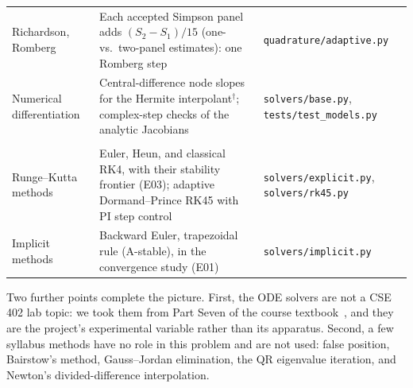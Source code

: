 \begin{table}[tp]
\begin{tabularx}{\textwidth}{@{}>{\raggedright\arraybackslash}p{2.7cm}
      >{\raggedright\arraybackslash}X >{\raggedright\arraybackslash}p{3.5cm}@{}}
    Richardson, Romberg & Each accepted Simpson panel adds $(S_2 - S_1)/15$ (one- vs.\ two-panel
      estimates): one Romberg step & \texttt{quadrature/adaptive.py} \\
    Numerical differentiation & Central-difference node slopes for the Hermite
      interpolant$^\dagger$; complex-step checks of the analytic Jacobians
      & \texttt{solvers/base.py}, \texttt{tests/test\_models.py} \\
    \midrule
    \multicolumn{3}{@{}l}{\textbf{Beyond the lab outline: ODE solvers (course textbook~\cite{chapra2015}, Part Seven)}} \\
    Runge--Kutta methods & Euler, Heun, and classical RK4, with their stability frontier (E03);
      adaptive Dormand--Prince RK45 with PI step control
      & \texttt{solvers/explicit.py}, \texttt{solvers/rk45.py} \\
    Implicit methods & Backward Euler, trapezoidal rule (A-stable), in the convergence study (E01)
      & \texttt{solvers/implicit.py} \\
    \bottomrule
  \end{tabularx}
\end{table}

Two further points complete the picture. First, the ODE solvers are not a CSE 402 lab topic: we
took them from Part Seven of the course textbook~\cite{chapra2015}, and they are the project's
experimental variable rather than its apparatus. Second, a few syllabus methods have no role in
this problem and are not used: false position, Bairstow's method, Gauss--Jordan elimination, the
QR eigenvalue iteration, and Newton's divided-difference interpolation.
